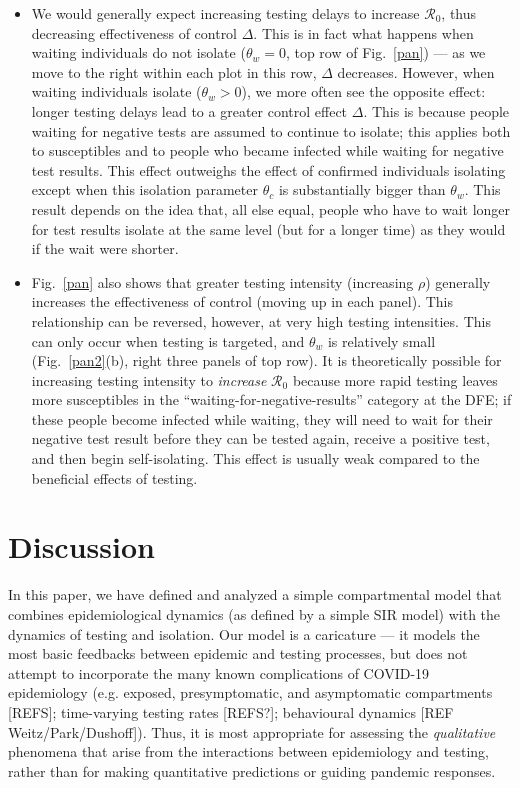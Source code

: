 \documentclass[12pt]{article}
\newcommand{\fref}[1]{Fig.~\ref{#1}}
\newcommand{\Rnum}{\ensuremath{\mathcal{R}_0}\xspace}
\DeclareRobustCommand\_{\ifmmode\expandafter\subtxt\else\textunderscore\fi}
\theoremstyle{definition} %
\begin{document}
\begin{itemize}
\item We would generally expect increasing testing delays to increase \Rnum, thus decreasing effectiveness of control $\Delta$. This is in fact what happens when waiting individuals do not isolate ($\theta_w =0$, top row of \fref{pan}) --- as we move to the right within each plot in this row, $\Delta$ decreases.
However, when waiting individuals isolate ($\theta_w>0$), we more often see the opposite effect: longer testing delays lead to a greater control effect $\Delta$. This is because people waiting for negative tests are assumed to continue to isolate; this applies both to susceptibles and to people who became infected while waiting for negative test results. This effect outweighs the effect of confirmed individuals isolating except when this isolation parameter $\theta_c$ is substantially bigger than $\theta_w$. This result depends on the idea that, all else equal, people who have to wait longer for test results isolate at the same level (but for a longer time) as they would if the wait were shorter.
\item \fref{pan} also shows that greater testing intensity (increasing $\rho$) generally increases the effectiveness of control (moving up in each panel). This relationship can be reversed, however, at very high testing intensities. This can only occur when testing is targeted, and $\theta_w$ is relatively small (\fref{pan2}(b), right three panels of top row). It is theoretically possible for increasing testing intensity to \emph{increase} \Rnum because more rapid testing leaves more susceptibles in the ``waiting-for-negative-results'' category at the DFE; if these people become infected while waiting, they will need to wait for their negative test result before they can be tested again, receive a positive test, and then begin self-isolating. This effect is usually weak compared to the beneficial effects of testing.

\end{itemize}
  

\section{Discussion}

In this paper, we have defined and analyzed a simple compartmental model that combines epidemiological dynamics (as defined by a simple SIR model) with the dynamics of testing and isolation. Our model is a caricature --- it models the most basic feedbacks between epidemic and testing processes, but does not attempt to incorporate the many known complications of COVID-19 epidemiology (e.g. exposed, presymptomatic, and asymptomatic compartments [REFS]; time-varying testing rates [REFS?]; behavioural dynamics [REF Weitz/Park/Dushoff]). Thus, it is most appropriate for assessing the \emph{qualitative} phenomena that arise from the interactions between epidemiology and testing, rather than for making quantitative predictions or guiding pandemic responses.
\end{document}
